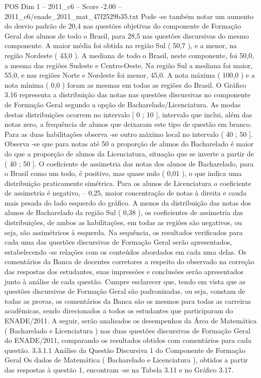 \begin{textsample}{POS Dim 1 – 2011\_c6 – Score -2.00 – 2011\_c6/enade\_2011\_mat\_47f2529b35.txt}
Pode -se também notar um aumento do desvio padrão de 20,4 nas questões objetivas do componente de Formação Geral dos alunos de todo o Brasil, para 28,5 nas questões discursivas do mesmo componente.
A maior média foi obtida na região Sul ( 50,7 ), e a menor, na região Nordeste ( 43,0 ).
A mediana de todo o Brasil, neste componente, foi 50,0, a mesma das regiões Sudeste e Centro-Oeste.
Na região Sul a mediana foi maior, 55,0, e nas regiões Norte e Nordeste foi menor, 45,0.
A nota máxima ( 100,0 ) e a nota mínima ( 0,0 ) foram as mesmas em todas as regiões do Brasil.
O Gráfico 3.16 representa a distribuição das notas nas questões discursivas no componente de Formação Geral segundo a opção de Bacharelado/Licenciatura.
As modas destas distribuições ocorrem no intervalo [ 0 ; 10 ], intervalo que inclui, além das notas zero, a frequência de alunos que deixaram este tipo de questão em branco.
Para as duas habilitações observa -se outro máximo local no intervalo ( 40 ; 50 ].
Observa -se que para notas até 50 a proporção de alunos do Bacharelado é maior do que a proporção de alunos da Licenciatura, situação que se inverte a partir de ( 40 ; 50 ].
O coeficiente de assimetria das notas dos alunos de Bacharelado, para o Brasil como um todo, é positivo, mas quase nulo ( 0,01 ), o que indica uma distribuição praticamente simétrica.
Para os alunos de Licenciatura o coeficiente de assimetria é negativo, – 0,25, maior concentração de notas à direita e cauda mais pesada do lado esquerdo do gráfico.
A menos da distribuição das notas dos alunos de Bacharelado da região Sul ( 0,38 ), os coeficientes de assimetria das distribuições, de ambos as habilitações, em todas as regiões são negativos, ou seja, são assimétricos à esquerda.
Na sequência, os resultados verificados para cada uma das questões discursivas de Formação Geral serão apresentados, estabelecendo -se relações com os conteúdos abordados em cada uma delas.
Os comentários da Banca de docentes corretores a respeito do observado na correção das respostas dos estudantes, suas impressões e conclusões serão apresentados junto à análise de cada questão.
Cumpre esclarecer que, tendo em vista que as questões discursivas de Formação Geral são padronizadas, ou seja, constam de todas as provas, os comentários da Banca são os mesmos para todas as carreiras acadêmicas, sendo direcionados a todos os estudantes que participaram do ENADE/2011.
A seguir, serão analisados os desempenhos da Área de Matemática ( Bacharelado e Licenciatura ) nas duas questões discursivas de Formação Geral do ENADE/2011, comparando os resultados obtidos com comentários para cada questão. 3.3.1.1 Análise da Questão Discursiva 1 do Componente de Formação Geral Os dados de Matemática ( Bacharelado e Licenciatura ), obtidos a partir das respostas à questão 1, encontram -se na Tabela 3.11 e no Gráfico 3.17.

\end{textsample}
